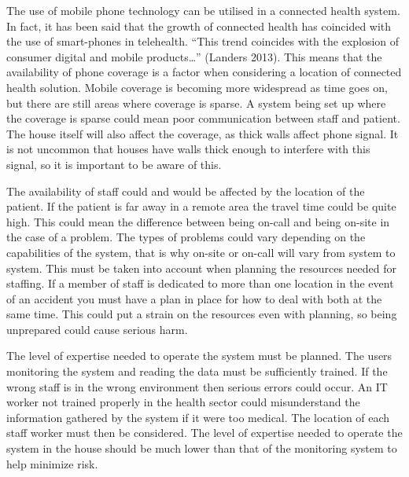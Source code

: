 The use of mobile phone technology can be utilised in a connected health system. In fact, it has been said that the growth of connected health has coincided with the use of smart-phones in telehealth. “This trend coincides with the explosion of consumer digital and mobile products…” (Landers 2013). This means that the availability of phone coverage is a factor when considering a location of connected health solution. Mobile coverage is becoming more widespread as time goes on, but there are still areas where coverage is sparse. A system being set up where the coverage is sparse could mean poor communication between staff and patient. The house itself will also affect the coverage, as thick walls affect phone signal. It is not uncommon that houses have walls thick enough to interfere with this signal, so it is important to be aware of this.

The availability of staff could and would be affected by the location of the patient. If the patient is far away in a remote area the travel time could be quite high. This could mean the difference between being on-call and being on-site in the case of a problem. The types of problems could vary depending on the capabilities of the system, that is why on-site or on-call will vary from system to system. This must be taken into account when planning the resources needed for staffing. If a member of staff is dedicated to more than one location in the event of an accident you must have a plan in place for how to deal with both at the same time. This could put a strain on the resources even with planning, so being unprepared could cause serious harm.

The level of expertise needed to operate the system must be planned. The users monitoring the system and reading the data must be sufficiently trained. If the wrong staff is in the wrong environment then serious errors could occur. An IT worker not trained properly in the health sector could misunderstand the information gathered by the system if it were too medical. The location of each staff worker must then be considered. The level of expertise needed to operate the system in the house should be much lower than that of the monitoring system to help minimize risk.

